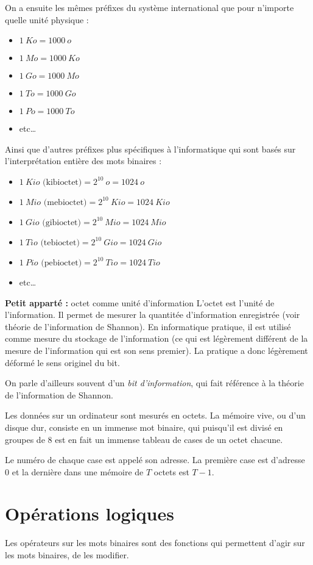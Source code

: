 \documentclass[../../main.tex]{subfiles}
\begin{document}
On a ensuite les mêmes préfixes du système international que pour n'importe quelle unité physique :
\begin{itemize}
  \item $1\ Ko = 1000\ o$
  \item $1\ Mo = 1000\ Ko$
  \item $1\ Go = 1000\ Mo$
  \item $1\ To = 1000\ Go$
  \item $1\ Po = 1000\ To$
  \item etc\dots
\end{itemize}
Ainsi que d'autres préfixes plus spécifiques à l'informatique qui sont basés sur l'interprétation entière des mots binaires :
\begin{itemize}
  \item $1\ Kio \text{ (kibioctet)} = 2^{10}\ o = 1024\ o$
  \item $1\ Mio \text{ (mebioctet)} = 2^{10}\ Kio = 1024\ Kio$
  \item $1\ Gio \text{ (gibioctet)} = 2^{10}\ Mio = 1024\ Mio$
  \item $1\ Tio \text{ (tebioctet)} = 2^{10}\ Gio = 1024\ Gio$
  \item $1\ Pio \text{ (pebioctet)} = 2^{10}\ Tio = 1024\ Tio$
  \item etc\dots
\end{itemize}
\begin{minitelbasicbox}{\textbf{Petit apparté :} octet comme unité d'information}
L'octet est l'unité de l'information. Il permet de mesurer la quantitée d'information enregistrée (voir théorie de l'information de Shannon). En informatique pratique, il est utilisé comme mesure du stockage de l'information (ce qui est légèrement différent de la mesure de l'information qui est son sens premier). La pratique a donc légèrement déformé le sens originel du bit.

On parle d'ailleurs souvent d'un \textit{bit d'information}, qui fait référence à la théorie de l'information de Shannon.
\end{minitelbasicbox}
Les données sur un ordinateur sont mesurés en octets. La mémoire vive, ou d'un disque dur, consiste en un immense mot binaire, qui puisqu'il est divisé en groupes de 8 est en fait un immense tableau de cases de un octet chacune.

Le numéro de chaque case est appelé son adresse. La première case est d'adresse 0 et la dernière dans une mémoire de $T$ octets est $T-1$.
\section{Opérations logiques}
Les opérateurs sur les mots binaires sont des fonctions qui permettent d'agir sur les mots binaires, de les modifier.
\end{document}

